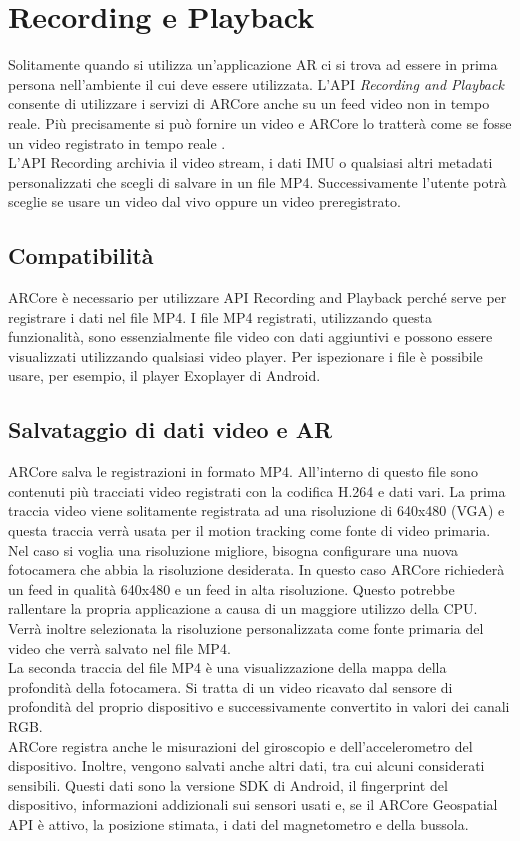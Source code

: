 \documentclass[crop=false, class=book]{standalone}
\begin{document}
	\chapter{Recording e Playback}
	
	Solitamente quando si utilizza un’applicazione AR ci si trova ad essere in prima persona nell’ambiente il cui deve essere utilizzata.	L'API \textit{Recording and Playback} consente di utilizzare i servizi di ARCore anche su un feed video non in tempo reale. Più precisamente si può fornire un video e ARCore lo tratterà come se fosse un video registrato in tempo reale \cite{google2022rec}.
	\\
	\noindent
	L'API Recording archivia il video stream, i dati IMU o qualsiasi altri metadati personalizzati che scegli di salvare in un file MP4. Successivamente l’utente potrà sceglie se usare un video dal vivo oppure un video preregistrato.
 
	\section{Compatibilità}
	ARCore è necessario per utilizzare API Recording and Playback perché serve per registrare i dati nel file MP4. I file MP4 registrati, utilizzando questa funzionalità, sono essenzialmente file video con dati aggiuntivi e possono essere visualizzati utilizzando qualsiasi video player. Per ispezionare i file è possibile usare, per esempio, il player Exoplayer di Android.
	 
	\section{Salvataggio di dati video e AR}
	ARCore salva le registrazioni in formato MP4. All’interno di questo file sono contenuti più tracciati video registrati con la codifica H.264 e dati vari. La prima traccia video viene solitamente registrata ad una risoluzione di 640x480 (VGA) e questa traccia verrà usata per il motion tracking come fonte di video primaria.
	\\
	\noindent
	Nel caso si voglia una risoluzione migliore, bisogna configurare una nuova fotocamera che abbia la risoluzione desiderata.
	In questo caso ARCore richiederà un feed in qualità 640x480 e un feed in alta risoluzione. Questo potrebbe rallentare la propria applicazione a causa di un maggiore utilizzo della CPU. Verrà inoltre selezionata la risoluzione personalizzata come fonte primaria del video che verrà salvato nel file MP4.
	\\
	\noindent
	La seconda traccia del file MP4 è una visualizzazione della mappa della profondità della fotocamera. Si tratta di un video ricavato dal sensore di profondità del proprio dispositivo e successivamente convertito in valori dei canali RGB.
	\\
	\noindent
	ARCore registra anche le misurazioni del giroscopio e dell’accelerometro del dispositivo. Inoltre, vengono salvati anche altri dati, tra cui alcuni considerati sensibili. Questi dati sono la versione SDK di Android, il fingerprint del dispositivo, informazioni addizionali sui sensori usati e, se il ARCore Geospatial API è attivo, la posizione stimata, i dati del magnetometro e della bussola.
	 
\end{document}
